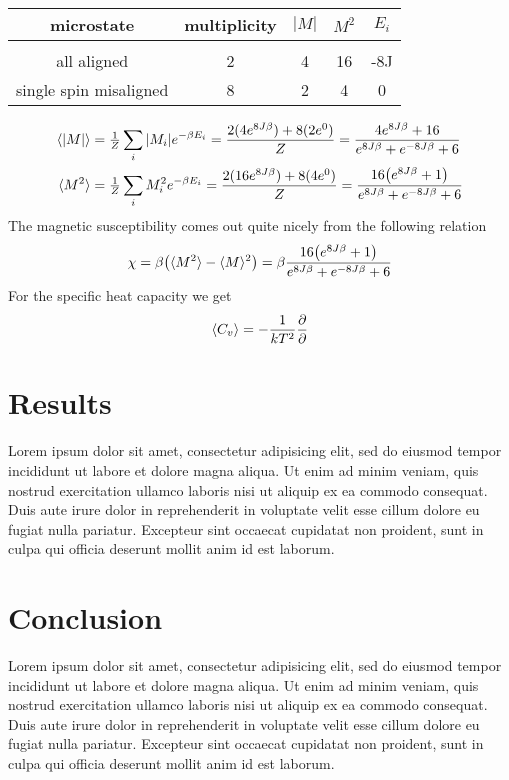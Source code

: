 \documentclass[a4paper, 12pt]{article}
\newcommand{\expect}[1]{\langle #1 \rangle}
\begin{document}
{		\begin{center}
		\begin{tabular}{c c c c c}
			microstate	&	multiplicity	&	$|M|$	&	$M^2$ 	&	$E_i$\\
			\hline \\
			all aligned	&	2	&	4	&	16	&	-8J\\
			single spin misaligned & 8	&	2	&	4	&	0
		\end{tabular}
		\end{center}

		\begin{align*}
			\langle \abs{M} \rangle & = \tfrac{1}{Z} \sum_{i}\abs{M_i}e^{-\beta E_i} = \frac{2(4e^{8J\beta}) + 8(2e^{0})}{Z} = 
			\frac{4e^{8J\beta}+16}{e^{8J\beta}+e^{-8J\beta}+6}\\
			\langle M^2 \rangle & = \tfrac{1}{Z} \sum_{i}M_i^2e^{-\beta E_i} = \frac{2(16e^{8J\beta}) + 8(4e^{0})}{Z} = 
			\frac{16\qty(e^{8J\beta}+1)}{e^{8J\beta}+e^{-8J\beta}+6}\\
		\end{align*}
		The magnetic susceptibility comes out quite nicely from the following relation
		\begin{equation*}
			\chi = \beta \qty( \expect{M^2} - \expect{M}^2 ) = \beta \frac{16\qty(e^{8J\beta}+1)}{e^{8J\beta}+e^{-8J\beta}+6}
		\end{equation*}
		For the specific heat capacity we get
		\begin{equation}
			\expect{C_v} = -\frac{1}{kT^2}\pdv{}
		\end{equation}

	
\newpage
\section{Results}
	Lorem ipsum dolor sit amet, consectetur adipisicing elit, sed do eiusmod
	tempor incididunt ut labore et dolore magna aliqua. Ut enim ad minim veniam,
	quis nostrud exercitation ullamco laboris nisi ut aliquip ex ea commodo
	consequat. Duis aute irure dolor in reprehenderit in voluptate velit esse
	cillum dolore eu fugiat nulla pariatur. Excepteur sint occaecat cupidatat non
	proident, sunt in culpa qui officia deserunt mollit anim id est laborum.

	
\newpage
\section{Conclusion}
	Lorem ipsum dolor sit amet, consectetur adipisicing elit, sed do eiusmod
	tempor incididunt ut labore et dolore magna aliqua. Ut enim ad minim veniam,
	quis nostrud exercitation ullamco laboris nisi ut aliquip ex ea commodo
	consequat. Duis aute irure dolor in reprehenderit in voluptate velit esse
	cillum dolore eu fugiat nulla pariatur. Excepteur sint occaecat cupidatat non
	proident, sunt in culpa qui officia deserunt mollit anim id est laborum.

}
\end{document}
